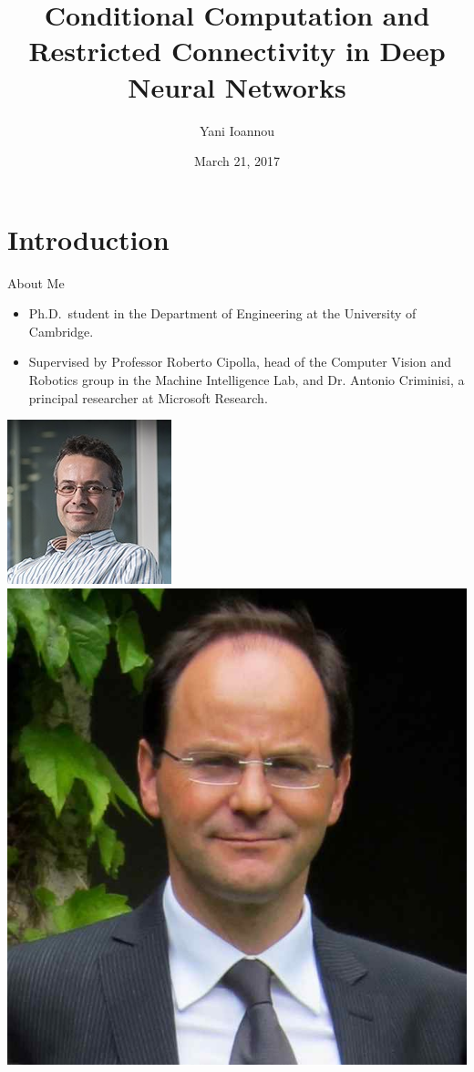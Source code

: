 \documentclass[t,xcolor=dvipsnames]{beamer}
\title[Conditional Computation and Restricted Connectivity in Deep Neural Networks] %
{Conditional Computation and Restricted Connectivity in Deep Neural Networks}
\author[Yani Ioannou]
{Yani Ioannou}
\institute[University of Cambridge] %
{University of Cambridge}
\date{March 21, 2017}
\begin{document}


\begin{frame}
  \titlepage
\end{frame}







\section{Introduction}
\begin{frame}{About Me}
\begin{itemize}
\item Ph.D.\ student in the Department of Engineering at the University of Cambridge.
\item Supervised by Professor Roberto Cipolla, head of the Computer Vision and Robotics group in the Machine Intelligence Lab, and Dr. Antonio Criminisi, a principal researcher at Microsoft Research.
\end{itemize}
\centering
\includegraphics[width=0.207\linewidth]{antonio}~
\includegraphics[width=0.2\linewidth]{roberto}
\end{frame}
\end{document}
